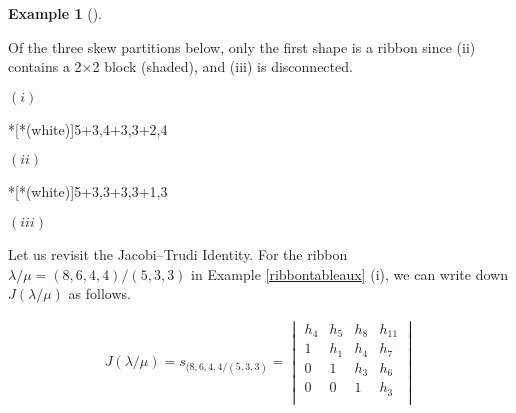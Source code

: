 \documentclass[numbers=enddot,12pt,final,onecolumn,notitlepage]{scrartcl}%
\theoremstyle{definition}
\newtheorem{exam}[theo]{Example}
\newenvironment{example}[1][]
{\begin{exam}[#1]\begin{leftbar}}
{\end{leftbar}\end{exam}}
\theoremstyle{plainsl}
\begin{document}
\begin{example}
\label{ribbontableaux}
Of the three skew partitions below, only the first shape is a ribbon since (ii) contains a 2$\times$2 block (shaded), and (iii) is disconnected.

\begin{minipage}[t]{0.30\textwidth}
\begin{center}

$(i)$
\end{center}
\end{minipage}
\begin{minipage}[t]{0.30\textwidth}
\begin{center}
*[*(white)]{5+3,4+3,3+2,4}

$(ii)$
\end{center}
\end{minipage}
\begin{minipage}[t]{0.30\textwidth}
\begin{center}
*[*(white)]{5+3,3+3,3+1,3}

$(iii)$
\end{center}
\end{minipage}


\end{example}



Let us revisit the Jacobi--Trudi Identity. For the ribbon  $\lambda/\mu= (8,6,4,4)/(5,3,3)$ in Example \ref{ribbontableaux} (i), we can write down $J(\lambda/\mu)$ as follows. 

\begin{align*}
J(\lambda/\mu) = s_{(8,6,4,4/ (5,3,3)} =
\begin{vmatrix}
h_4 & h_5 & h_8 & h_{11} \\ 
1 & h_1 & h_4 & h_7  \\
0 & 1 & h_3 & h_6 \\
0 & 0 & 1 & h_3  \\ 
\end{vmatrix}\\
\end{align*}
\end{document}
